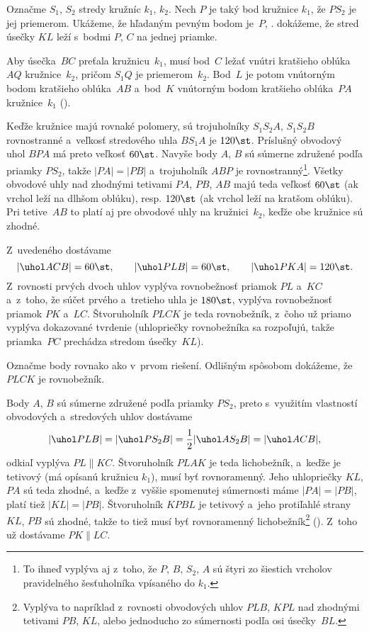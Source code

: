 {%
Označme $S_1$, $S_2$ stredy kružníc $k_1$, $k_2$. Nech $P$ je taký bod kružnice $k_1$, že $PS_2$ je jej priemerom. Ukážeme, že hľadaným pevným bodom je~$P$, \tj. dokážeme, že stred úsečky $KL$ leží s~bodmi $P$, $C$ na jednej priamke.

Aby úsečka~$BC$ preťala kružnicu~$k_1$, musí bod~$C$ ležať vnútri kratšieho oblúka~$AQ$ kružnice~$k_2$, pričom $S_1Q$ je priemerom~$k_2$. Bod~$L$ je potom vnútorným bodom kratšieho oblúka~$AB$ a~bod~$K$ vnútorným bodom kratšieho oblúka~$PA$ kružnice~$k_1$ (\obr).
%

Keďže kružnice majú rovnaké polomery, sú trojuholníky $S_1S_2A$, $S_1S_2B$ rovnostranné a~veľkosť stredového uhla $BS_1A$ je $120\st$. Príslušný obvodový uhol $BPA$ má preto veľkosť $60\st$. Navyše body $A$, $B$ sú súmerne združené podľa priamky $PS_2$, takže $|PA|=|PB|$ a~trojuholník $ABP$ je rovnostranný\footnote{To ihneď vyplýva aj z~toho, že $P$, $B$, $S_2$, $A$ sú štyri zo šiestich vrcholov pravidelného šesťuholníka vpísaného do $k_1$.}. Všetky obvodové uhly nad zhodnými tetivami $PA$, $PB$, $AB$ majú teda veľkosť $60\st$ (ak vrchol leží na dlhšom oblúku), resp. $120\st$ (ak vrchol leží na kratšom oblúku). Pri tetive~$AB$ to platí aj pre obvodové uhly na kružnici~$k_2$, keďže obe kružnice sú zhodné.

Z~uvedeného dostávame
$$
|\uhol ACB|=60\st,\qquad |\uhol PLB|=60\st,\qquad|\uhol PKA|=120\st.
$$
Z~rovnosti prvých dvoch uhlov vyplýva rovnobežnosť priamok $PL$ a~$KC$ a~z~toho, že súčet prvého a~tretieho uhla je $180\st$, vyplýva rovnobežnosť priamok $PK$ a~$LC$. Štvoruholník $PLCK$ je teda rovnobežník, z~čoho už priamo vyplýva dokazované tvrdenie (uhlopriečky rovnobežníka sa rozpoľujú, takže priamka~$PC$ prechádza stredom úsečky~$KL$).

\ineriesenie
Označme body rovnako ako v~prvom riešení. Odlišným spôsobom dokážeme, že $PLCK$ je rovnobežník.
%

Body $A$, $B$ sú súmerne združené podľa priamky $PS_2$, preto s~využitím vlastností obvodových a~stredových uhlov dostávame
$$
|\uhol PLB|=|\uhol PS_2B|=\frac12|\uhol AS_2B|=|\uhol ACB|,
$$
odkiaľ vyplýva $PL\parallel KC$. Štvoruholník $PLAK$ je teda lichobežník, a~keďže je tetivový (má opísanú kružnicu $k_1$), musí byť rovnoramenný. Jeho uhlopriečky $KL$, $PA$ sú teda zhodné, a~keďže z~vyššie spomenutej súmernosti máme $|PA|=|PB|$, platí tiež $|KL|=|PB|$. Štvoruholník $KPBL$ je tetivový a~jeho protiľahlé strany $KL$, $PB$ sú zhodné, takže to tiež musí byť rovnoramenný lichobežník\footnote{Vyplýva to napríklad z~rovnosti obvodových uhlov $PLB$, $KPL$ nad zhodnými tetivami $PB$, $KL$, alebo jednoducho zo súmernosti podľa osi úsečky~$BL$.} (\obr). Z~toho už dostávame $PK\parallel LC$.

}
